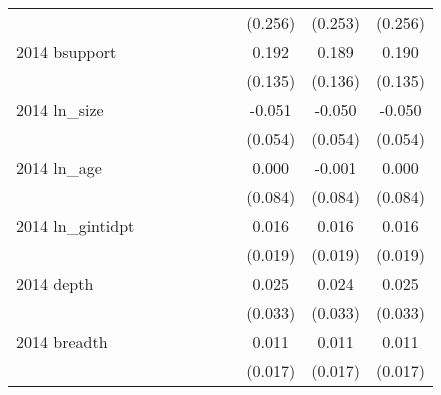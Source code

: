 \begin{table}[htbp]
\begin{tabular}{l*{9}{c}}
                    &               &               &               &               &               &               &     (0.256)   &     (0.253)   &     (0.256)   \\
2014 bsupport       &               &               &               &               &               &               &       0.192   &       0.189   &       0.190   \\
                    &               &               &               &               &               &               &     (0.135)   &     (0.136)   &     (0.135)   \\
2014 ln\_size        &               &               &               &               &               &               &      -0.051   &      -0.050   &      -0.050   \\
                    &               &               &               &               &               &               &     (0.054)   &     (0.054)   &     (0.054)   \\
2014 ln\_age         &               &               &               &               &               &               &       0.000   &      -0.001   &       0.000   \\
                    &               &               &               &               &               &               &     (0.084)   &     (0.084)   &     (0.084)   \\
2014 ln\_gintidpt    &               &               &               &               &               &               &       0.016   &       0.016   &       0.016   \\
                    &               &               &               &               &               &               &     (0.019)   &     (0.019)   &     (0.019)   \\
2014 depth          &               &               &               &               &               &               &       0.025   &       0.024   &       0.025   \\
                    &               &               &               &               &               &               &     (0.033)   &     (0.033)   &     (0.033)   \\
2014 breadth        &               &               &               &               &               &               &       0.011   &       0.011   &       0.011   \\
                    &               &               &               &               &               &               &     (0.017)   &     (0.017)   &     (0.017)   \\

\end{tabular}
\end{table}
